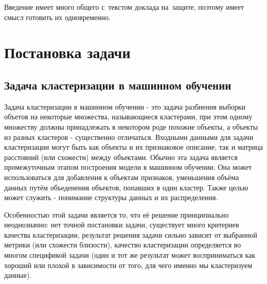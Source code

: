 \documentclass[12pt,fleqn]{article}
\begin{document}
Введение имеет много общего с~текстом доклада на~защите, поэтому имеет смысл готовить их одновременно.

\section{Постановка задачи}

\subsection{Задача кластеризации в машинном обучении}

Задача кластеризации в машинном обучении - это задача разбиения выборки объетов на некоторые множества, называющиеся кластерами, при этом одному множеству должны принадлежать в некотором роде похожие объекты, а объекты из разных кластеров - существенно отличаться. Входными данными для задачи кластеризации могут быть как объекты и их признаковое описание, так и матрица расстояний (или схожести) между объектами. Обычно эта задача является промежуточным этапом построения модели в машинном обучении. Она может использоваться для добавления к объектам признаков, уменьшения объёма данных путём объеденения объектов, попавших в один кластер. Также целью может служить - понимание структуры данных и их распределения.

Особенностью этой задачи является то, что её решение принципиально неоднозначно: нет точной постановки задачи, существует много критериев качества кластеризации, результат решения задачи сильно зависит от выбранной метрики (или схожести близости), качество кластеризации определяется во многом спецификой задачи (один и тот же результат может восприниматься как хороший или плохой в зависимости от того, для чего именно мы кластеризуем данные).
\end{document}
